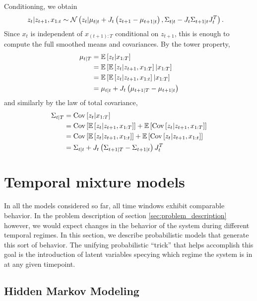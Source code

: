 \documentclass{article}
\begin{document}
Conditioning, we obtain
\begin{align*}
  z_{t} \vert z_{t + 1}, x_{1:t} &\sim \mathcal{N}\left(
  z_{t} \vert \mu_{t \vert t} + J_{t}\left(z_{t + 1} - \mu_{t + 1 \vert t}\right),
  \Sigma_{t \vert t} - J_{t} \Sigma_{t + 1 \vert t} J_{t}^{T}
  \right).
\end{align*}
Since $x_{t}$ is independent of $x_{(t + 1): T}$ conditional on $z_{t + 1}$,
this is enough to compute the full smoothed means and covariances. By the tower
property,
\begin{align*}
  \mu_{t \vert T} &= \mathbb{E}\left[{z_{t} \vert x_{1:T}}\right] \\
  &= \mathbb{E}\left[{\mathbb{E}\left[{z_{t} \vert z_{t + 1}, x_{1 : T}}\right] \vert x_{1:T}}\right] \\
  &= \mathbb{E}\left[{\mathbb{E}\left[{z_{t} \vert z_{t + 1}, x_{1:t}}\right] \vert x_{1:T}}\right] \\
  &= \mu_{t \vert t} + J_{t}\left(\mu_{t + 1 \vert T} - \mu_{t + 1 \vert t}\right)
\end{align*}
and similarly by the law of total covariance,
\begin{align*}
  \Sigma_{t\vert T} &= \mathrm{Cov}\left[{z_{t} \vert x_{1:T}}\right] \\
  &= \mathrm{Cov}\left[{\mathbb{E}\left[{z_{t} \vert z_{t + 1}, x_{1:T}}\right]}\right] + \mathbb{E}\left[{\mathrm{Cov}\left[{z_{t} \vert z_{t + 1}, x_{1:T}}\right]}\right] \\
  &= \mathrm{Cov}\left[{\mathbb{E}\left[{z_{t} \vert z_{t + 1}, x_{1:t}}\right]}\right] + \mathbb{E}\left[{\mathrm{Cov}\left[{z_{t} \vert z_{t + 1}, x_{1:t}}\right]}\right] \\
  &= \Sigma_{t \vert t} + J_{t}\left(\Sigma_{t + 1 \vert T} - \Sigma_{t + 1 \vert t}\right) J_{t}^{T}
\end{align*}

\section{Temporal mixture models}
\label{sec:temporal_mixture_models}

In all the models considered so far, all time windows exhibit comparable
behavior. In the problem description of section \ref{sec:problem_description}
however, we would expect changes in the behavior of the system during different
temporal regimes. In this section, we describe probabilistic models that
generate this sort of behavior. The unifying probabilistic ``trick'' that helps
accomplish this goal is the introduction of latent variables specying which
regime the system is in at any given timepoint.

\subsection{Hidden Markov Modeling}
\end{document}
